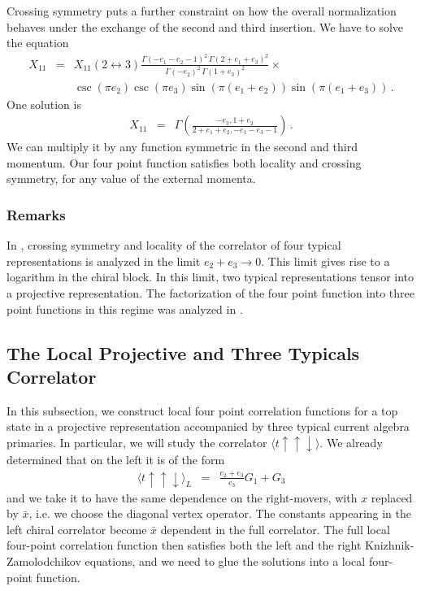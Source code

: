 \documentclass[12pt]{article}
\numberwithin{equation}{section}
\numberwithin{equation}{section}
\numberwithin{table}{section}\setlength{\multlinegap}{25pt}
\begin{document}
Crossing symmetry puts a further constraint on how the overall normalization behaves
under the exchange of the second and third insertion. We have to solve the equation
\begin{eqnarray}
X_{11} &=&  X_{11}(2 \leftrightarrow 3)
 \frac{\Gamma (-e_1-e_2-1)^2 \, \Gamma (2+e_1+e_3)^2}{  \Gamma (-e_2)^2 \, \Gamma (1+e_3)^2} \times
\nonumber \\
& & \csc(\pi e_2) \csc(\pi e_3) \sin (\pi(e_1+e_2)) \sin (\pi(e_1+e_3))\, .
\end{eqnarray}
One solution is
\begin{eqnarray}
X_{11} &=& \Gamma(\frac{-e_3,1+e_2}{2+e_1+e_2,-e_1-e_3-1})  \, .
\end{eqnarray}
We can multiply it by any function symmetric in the second and third momentum.
Our four point function satisfies both locality and crossing symmetry, for any value of the external momenta.

\subsubsection*{Remarks}
In \cite{Rozansky:1992rx}, crossing symmetry and locality of the correlator of four typical representations is analyzed
in the limit $e_2 + e_3 \rightarrow 0$. This limit gives rise to a logarithm in the chiral
block. In this limit, two typical representations tensor into a projective representation. The factorization of the 
four point function into three point functions in this regime was analyzed in \cite{Schomerus:2005bf}.


\subsection{The Local Projective and Three Typicals Correlator}
In this subsection, we construct local four point correlation functions for a top state in a projective
representation accompanied by three typical current algebra primaries. In particular, we will study the correlator
 $\langle t \uparrow \uparrow \downarrow \rangle$. We already determined that on the left it is of the form
\begin{eqnarray}
\langle t \uparrow \uparrow \downarrow \rangle_L &=& \frac{e_2+e_3}{e_3} G_1 + G_3
\end{eqnarray}
and we take it to have the same dependence on the right-movers, with $x$ replaced by $\bar{x}$, i.e. we choose the diagonal
vertex operator. The constants appearing
in the left chiral correlator become $\bar{x}$ dependent in the full correlator. The full local four-point correlation
function then satisfies both the left and the right Knizhnik-Zamolodchikov equations, and we need to glue the solutions into
a  local four-point function.
\end{document}
